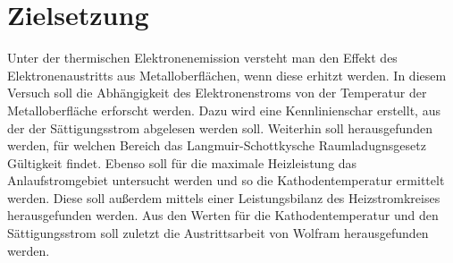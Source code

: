 \section{Zielsetzung}
\label{sec:Zielsetzung}

Unter der thermischen Elektronenemission versteht man den Effekt des 
Elektronenaustritts aus Metalloberflächen, wenn diese erhitzt werden. In 
diesem Versuch soll die Abhängigkeit des Elektronenstroms von der Temperatur 
der Metalloberfläche erforscht werden. Dazu wird eine Kennlinienschar erstellt, 
aus der der Sättigungsstrom abgelesen werden soll. Weiterhin soll herausgefunden 
werden, für welchen Bereich das Langmuir-Schottkysche Raumladugnsgesetz 
Gültigkeit findet. Ebenso soll für die maximale Heizleistung das Anlaufstromgebiet
untersucht werden und so die Kathodentemperatur ermittelt werden. Diese soll 
außerdem mittels einer Leistungsbilanz des Heizstromkreises herausgefunden 
werden. Aus den Werten für die Kathodentemperatur und den Sättigungsstrom soll 
zuletzt die Austrittsarbeit von Wolfram herausgefunden werden.